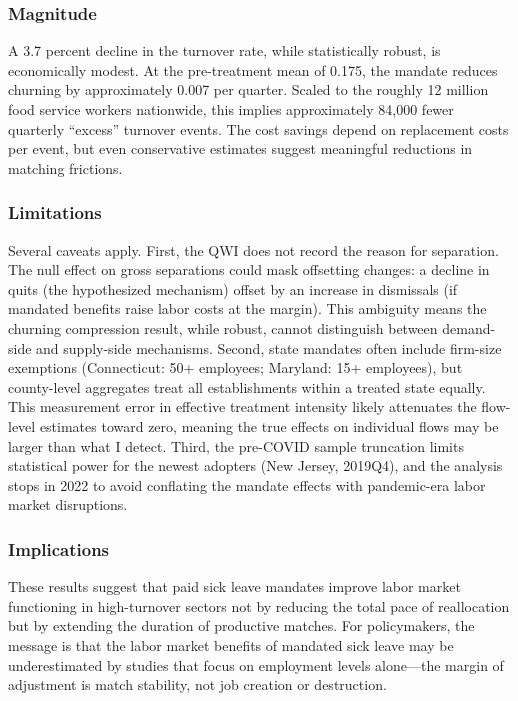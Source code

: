 \documentclass[12pt]{article}
\begin{document}
\subsubsection*{Magnitude} A 3.7 percent decline in the turnover rate, while statistically robust, is economically modest. At the pre-treatment mean of 0.175, the mandate reduces churning by approximately 0.007 per quarter. Scaled to the roughly 12 million food service workers nationwide, this implies approximately 84,000 fewer quarterly ``excess'' turnover events. The cost savings depend on replacement costs per event, but even conservative estimates suggest meaningful reductions in matching frictions.

\subsubsection*{Limitations} Several caveats apply. First, the QWI does not record the reason for separation. The null effect on gross separations could mask offsetting changes: a decline in quits (the hypothesized mechanism) offset by an increase in dismissals (if mandated benefits raise labor costs at the margin). This ambiguity means the churning compression result, while robust, cannot distinguish between demand-side and supply-side mechanisms. Second, state mandates often include firm-size exemptions (Connecticut: 50+ employees; Maryland: 15+ employees), but county-level aggregates treat all establishments within a treated state equally. This measurement error in effective treatment intensity likely attenuates the flow-level estimates toward zero, meaning the true effects on individual flows may be larger than what I detect. Third, the pre-COVID sample truncation limits statistical power for the newest adopters (New Jersey, 2019Q4), and the analysis stops in 2022 to avoid conflating the mandate effects with pandemic-era labor market disruptions.

\subsubsection*{Implications} These results suggest that paid sick leave mandates improve labor market functioning in high-turnover sectors not by reducing the total pace of reallocation but by extending the duration of productive matches. For policymakers, the message is that the labor market benefits of mandated sick leave may be underestimated by studies that focus on employment levels alone---the margin of adjustment is match stability, not job creation or destruction.
\end{document}
